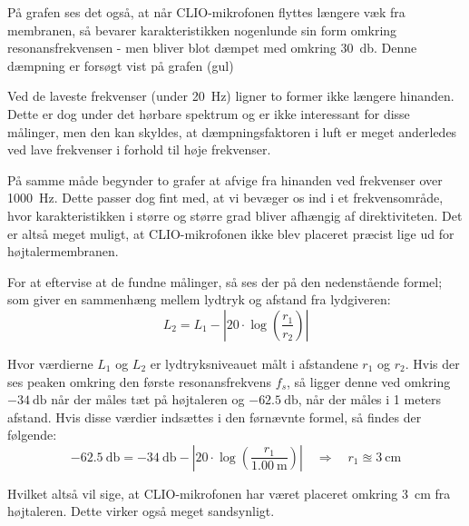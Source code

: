 På grafen ses det også, at når CLIO-mikrofonen flyttes længere væk fra membranen, så bevarer karakteristikken nogenlunde sin form omkring resonansfrekvensen - men bliver blot dæmpet med omkring \SI{30}{\decibel}. Denne dæmpning er forsøgt vist på grafen (gul)

Ved de laveste frekvenser (under \SI{20}{\hertz}) ligner to former ikke længere hinanden. Dette er dog under det hørbare spektrum og er ikke interessant for disse målinger, men den kan skyldes, at dæmpningsfaktoren i luft er meget anderledes ved lave frekvenser i forhold til høje frekvenser.

På samme måde begynder to grafer at afvige fra hinanden ved frekvenser over \SI{1000}{\hertz}. Dette passer dog fint med, at vi bevæger os ind i et frekvensområde, hvor karakteristikken i større og større grad bliver afhængig af direktiviteten. Det er altså meget muligt, at CLIO-mikrofonen ikke blev placeret præcist lige ud for højtalermembranen.

For at eftervise at de fundne målinger, så ses der på den nedenstående formel; som giver en sammenhæng mellem lydtryk og afstand fra lydgiveren:
\begin{equation}
L_2 = L_1 - \left| 20 \cdot \log \left( \frac{r_1}{r_2} \right) \right|
\end{equation}

Hvor værdierne $L_1$ og $L_2$ er lydtryksniveauet målt i afstandene $r_1$ og $r_2$. Hvis der ses peaken omkring den første resonansfrekvens $f_s$, så ligger denne ved omkring $-\SI{34}{\decibel}$ når der måles tæt på højtaleren og $-\SI{62.5}{\decibel}$, når der måles i 1 meters afstand. Hvis disse værdier indsættes i den førnævnte formel, så findes der følgende:
\begin{equation}
\SI{-62.5}{\decibel} = \SI{-34}{\decibel} - \left| 20 \cdot \log \left( \frac{r_1}{\SI{1.00}{\meter}} \right)\right| \quad \Rightarrow \quad r_1 \approxeq \SI{3}{\centi\meter}
\end{equation}

Hvilket altså vil sige, at CLIO-mikrofonen har været placeret omkring \SI{3}{\centi\meter} fra højtaleren. Dette virker også meget sandsynligt.